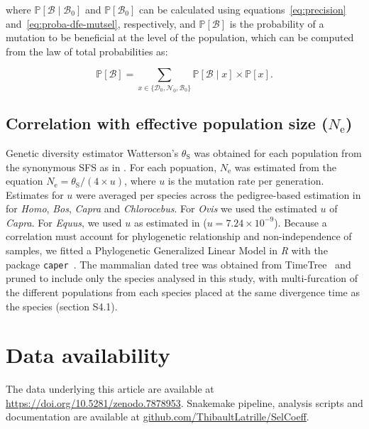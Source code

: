\documentclass{article}
\newcommand{\Ne}{N_{\text{e}}}
\newcommand{\proba}{\mathbb{P}}
\newcommand{\SphyDel}{\mathcal{D}_0}
\newcommand{\SphyNeu}{\mathcal{N}_0}
\newcommand{\SphyBen}{\mathcal{B}_0}
\newcommand{\Sphyclass}{x}
\newcommand{\given}{\mid}
\newcommand{\SpopBen}{\mathcal{B}}
\newcommand{\thetaSyn}{\theta_{\text{S}}}
\providecommand{\DIFaddbegin}{} %
\providecommand{\DIFaddend}{} %
\providecommand{\DIFdelbegin}{} %
\providecommand{\DIFdelend}{} %
\newcommand{\DIFscaledelfig}{0.5}
\newlength{\DIFdelgraphicswidth} %
\newlength{\DIFdelgraphicsheight} %
\newcommand{\DIFaddincludegraphics}[2][]{{\color{blue}\fbox{\DIFOincludegraphics[#1]{#2}}}} %
\newcommand{\DIFdelincludegraphics}[2][]{%
\sbox{\DIFdelgraphicsbox}{\DIFOincludegraphics[#1]{#2}}%
\settoboxwidth{\DIFdelgraphicswidth}{\DIFdelgraphicsbox} %
\settoboxtotalheight{\DIFdelgraphicsheight}{\DIFdelgraphicsbox} %
\scalebox{\DIFscaledelfig}{%
\parbox[b]{\DIFdelgraphicswidth}{\usebox{\DIFdelgraphicsbox}\\[-\baselineskip] \rule{\DIFdelgraphicswidth}{0em}}\llap{\resizebox{\DIFdelgraphicswidth}{\DIFdelgraphicsheight}{%
\setlength{\unitlength}{\DIFdelgraphicswidth}%
\begin{picture}(1,1)%
\thicklines\linethickness{2pt} %
{\color[rgb]{1,0,0}\put(0,0){\framebox(1,1){}}}%
{\color[rgb]{1,0,0}\put(0,0){\line( 1,1){1}}}%
{\color[rgb]{1,0,0}\put(0,1){\line(1,-1){1}}}%
\end{picture}%
}\hspace*{3pt}}} %
} %
\DeclareRobustCommand{\DIFaddbegin}{\DIFOaddbegin \let\includegraphics\DIFaddincludegraphics} %
\DeclareRobustCommand{\DIFaddend}{\DIFOaddend \let\includegraphics\DIFOincludegraphics} %
\DeclareRobustCommand{\DIFdelbegin}{\DIFOdelbegin \let\includegraphics\DIFdelincludegraphics} %
\DeclareRobustCommand{\DIFdelend}{\DIFOaddend \let\includegraphics\DIFOincludegraphics} %
\begin{document}
    where $\proba [\SpopBen \given \SphyBen]$ and $\proba [ \SphyBen ]$ can be calculated using equations~\ref{eq:precision} and~\ref{eq:proba-dfe-mutsel}, respectively, and $\proba [ \SpopBen ]$ is the probability of a mutation to be beneficial at the level of the population, which can be computed from the law of total probabilities as:

    \begin{equation}
        \proba [ \SpopBen ] = \sum_{\Sphyclass \in \{\SphyDel, \SphyNeu, \SphyBen \} }\proba [\SpopBen \given \Sphyclass ] \times \proba [\Sphyclass ].
        \label{eq:total_proba}
    \end{equation}

    \subsection{Correlation with effective population size ($\Ne$)}
    \label{subsec:correlation-diversity}
    Genetic diversity estimator Watterson's $\thetaSyn$ was obtained for each population from the synonymous SFS as in \textcite{achaz_frequency_2009}.
    For each popuation, $\Ne$ was estimated from the equation $\Ne=\thetaSyn / (4 \times u)$, where $u$ is the mutation rate per generation.
    Estimates for $u$ were averaged per species across the pedigree-based estimation in \textcite{bergeron_evolution_2023} for \textit{Homo}, \textit{Bos}, \textit{Capra} and \textit{Chlorocebus}.
    For \textit{Ovis} we used the estimated $u$ of \textit{Capra}.
    For \textit{Equus}, we used $u$ as estimated in \textcite{orlando_recalibrating_2013} ($u=7.24\times10^{-9}$).
    Because a correlation must account for phylogenetic relationship and non-independence of samples, we fitted a Phylogenetic Generalized Linear Model in \textit{R} with the package \texttt{caper}~\cite{orme_caper_2013}.
    The mammalian dated tree was obtained from TimeTree~\cite{kumar_timetree_2017} and pruned to include only the species analysed in this study, with multi-furcation of the different populations from each species placed at the same divergence time as the species (section S4.1).

    \section*{Data availability}
    The data underlying this article are available at \DIFdelbegin %
\DIFdelend \DIFaddbegin \url{https://doi.org/10.5281/zenodo.7878953}\DIFaddend .
    Snakemake pipeline, analysis scripts and documentation are available at \href{https://github.com/ThibaultLatrille/SelCoeff}{github.com/ThibaultLatrille/SelCoeff}.
\end{document}

